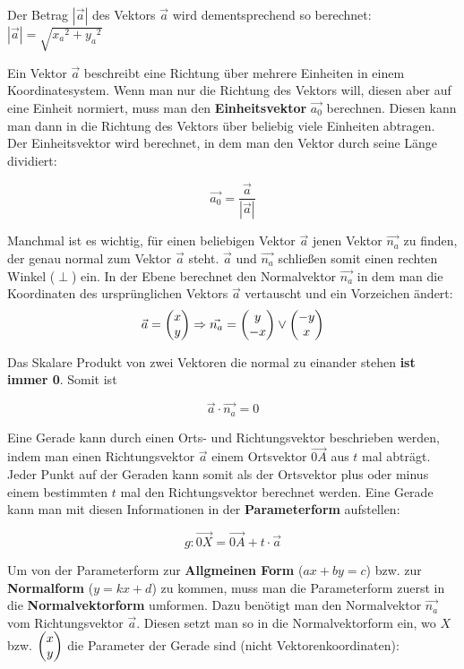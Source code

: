Der Betrag $|\vec{a}|$ des Vektors $\vec{a}$ wird dementsprechend so berechnet: $ |\vec{a}| = \sqrt{{x_{a}}^2 + {y_{a}}^2}$


Ein Vektor $\vec{a}$ beschreibt eine Richtung \"{u}ber mehrere Einheiten in einem Koordinatesystem. Wenn man nur die Richtung des Vektors will, diesen aber auf eine Einheit normiert, muss man den \textbf{Einheitsvektor} $\vec{a_{0}}$ berechnen. Diesen kann man dann in die Richtung des Vektors \"{u}ber beliebig viele Einheiten abtragen. Der Einheitsvektor wird berechnet, in dem man den Vektor durch seine L\"{a}nge dividiert:

$$\vec{a_{0}} = \frac{\vec{a}}{|\vec{a}|}$$


Manchmal ist es wichtig, f\"{u}r einen beliebigen Vektor $\vec{a}$ jenen Vektor $\vec{n_{a}}$ zu finden, der genau normal zum Vektor $\vec{a}$ steht. $\vec{a}$ und $\vec{n_{a}}$ schlie\ss{}en somit einen rechten Winkel ($\perp$) ein. In der Ebene berechnet den Normalvektor $\vec{n_{a}}$ in dem man die Koordinaten des urspr\"{u}nglichen Vektors $\vec{a}$ vertauscht und ein Vorzeichen \"{a}ndert:
$$ \vec{a} = \begin{pmatrix}x\\y\end{pmatrix} \Rightarrow \vec{n_{a}} = \begin{pmatrix}y \\ -x\end{pmatrix} \lor \begin{pmatrix}-y \\ x\end{pmatrix}$$

Das Skalare Produkt von zwei Vektoren die normal zu einander stehen \textbf{ist immer 0}. Somit ist

$$\vec{a} \cdot \vec{n_{a}} = 0$$

\pagebreak



Eine Gerade kann durch einen Orts- und Richtungsvektor beschrieben werden, indem man einen Richtungsvektor $\vec{a}$ einem Ortsvektor $\vec{0A}$ aus $t$ mal abtr\"{a}gt. Jeder Punkt auf der Geraden kann somit als der Ortsvektor plus oder minus einem bestimmten $t$ mal den Richtungsvektor berechnet werden. Eine Gerade kann man mit diesen Informationen in der \textbf{Parameterform} aufstellen:

$$g: \vec{0X} = \vec{0A} + t \cdot \vec{a}$$


Um von der Parameterform zur \textbf{Allgmeinen Form} ($ax + by = c$) bzw. zur \textbf{Normalform} ($y = kx + d$) zu kommen, muss man die Parameterform zuerst in die \textbf{Normalvektorform} umformen. Dazu ben\"{o}tigt man den Normalvektor $\vec{n_{a}}$ vom Richtungsvektor $\vec{a}$. Diesen setzt man so in die Normalvektorform ein, wo $X$ bzw. $\begin{pmatrix}x\\y\end{pmatrix}$ die Parameter der Gerade sind (nicht Vektorenkoordinaten):

